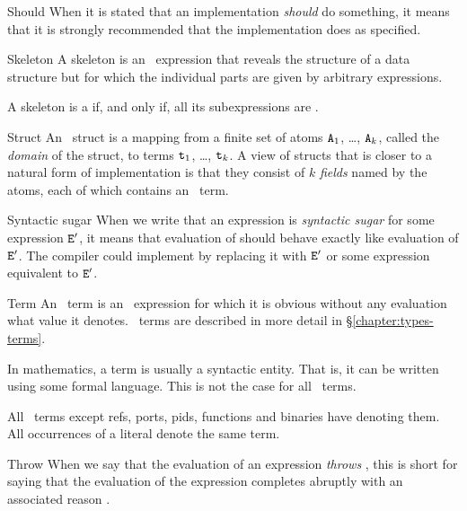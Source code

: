 \begin{Lentry}
\ifStd
\item[Should]
When it is stated that an implementation \emph{should} do something,
it means that it is strongly recommended that the implementation does
as specified.
\fi

\item[Skeleton]
A skeleton is an \Erlang\ expression that reveals the structure of a
data structure but for which the individual parts are given by
arbitrary expressions.

A skeleton is a  if, and only if, all its subexpressions
are .

\ifstruct
\item[Struct]
An \Erlang\ struct is a mapping from a finite set of atoms ${\tt{\sl A}}_1$,
\ldots, ${\tt{\sl A}}_k$, called the \emph{domain} of the struct, to terms
${\tt{\sl t}}_1$, \ldots, ${\tt{\sl t}}_k$.  A view of structs that is closer
to a natural form of implementation is that they consist of $k$
\emph{fields} named by the atoms, each of which contains an \Erlang\ term.
\fi

\item[Syntactic sugar]
When we write that an expression  is \emph{syntactic sugar} for
some expression ${\tt{\sl E}}'$, it means that evaluation of  should
behave exactly like evaluation of ${\tt{\sl E}}'$.  The compiler could
implement  by replacing it with ${\tt{\sl E}}'$ or some expression
equivalent to ${\tt{\sl E}}'$.

\item[Term]
An \Erlang\ term is an \Erlang\ expression for which it is obvious
without any evaluation what value it denotes.  \Erlang\ terms are
described in more detail in \S\ref{chapter:types-terms}.

In mathematics, a term is usually a syntactic entity.  That is, it can
be written using some formal language.  This is not the case for all
\Erlang\ terms.

All \Erlang\ terms except refs, ports, pids, functions and binaries
have  denoting them.  All
occurrences of a literal denote the same term.

\item[Throw]
When we say that the evaluation of an expression \emph{throws },
this is short for saying that the evaluation of the expression
completes abruptly with an associated reason
.


\end{Lentry}
